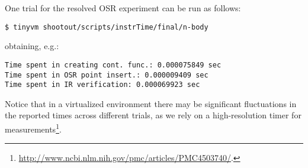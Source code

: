 \noindent One trial for the resolved OSR experiment can be run as follows:
\begin{small}
\begin{verbatim}
$ tinyvm shootout/scripts/instrTime/final/n-body
\end{verbatim}
\end{small}
\noindent obtaining, e.g.:
\begin{small}
\begin{verbatim}
Time spent in creating cont. func.: 0.000075849 sec
Time spent in OSR point insert.: 0.000009409 sec
Time spent in IR verification: 0.000069923 sec
\end{verbatim}
\end{small}

\noindent Notice that in a virtualized environment there may be significant fluctuations in the reported times across different trials, as we rely on a high-resolution timer for measurements\footnote{\url{http://www.ncbi.nlm.nih.gov/pmc/articles/PMC4503740/}.}.